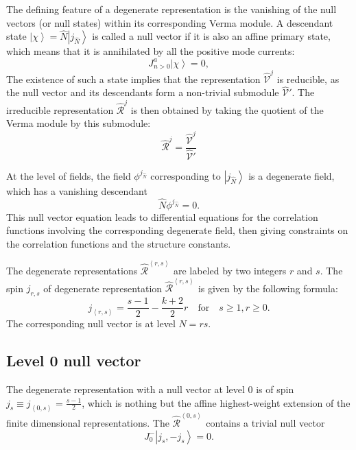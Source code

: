 \documentclass[10pt,a4paper]{article}
\numberwithin{equation}{section}
\newcommand{\ket}[1]{\left| #1 \right\rangle}
\newcommand{\vev}[1]{\left\langle #1 \right\rangle}
\begin{document}
The defining feature of a degenerate representation is the vanishing of the null vectors (or null states) within its corresponding Verma module.
A descendant state $\ket{\chi} = \hat{N} \ket{j_{\hat{N}}} $ is called a null vector if it is also an affine primary state, which means 
that it is annihilated by all the positive mode currents:
\begin{equation}
    J^{a}_{n>0} \ket{\chi} = 0, \label{nullvectoreq}
\end{equation}
The existence of such a state implies that the representation $\widehat{\mathcal{V}}^{j}$ is reducible, 
as the null vector and its descendants form a non-trivial submodule $\widehat{\mathcal{V}}'$. 
The irreducible representation $\widehat{\mathcal{R}}^{j}$ is then obtained by taking the quotient of the Verma module by this submodule:
\begin{equation}
    \widehat{\mathcal{R}}^{j} = \frac{\widehat{\mathcal{V}}^{j}}{ \widehat{\mathcal{V}}'}
\end{equation}

At the level of fields, the field $\phi^{j_{\hat{N}}}$ corresponding to
$\ket{j_{\hat{N}}}$ is a degenerate field, which has a vanishing descendant 
\begin{equation}
    \hat{N} \phi^{j_{\hat{N}}} = 0.
\end{equation}
This null vector equation leads to differential equations for the correlation functions involving the corresponding degenerate field, then 
giving constraints on the correlation functions and the structure constants. 

The degenerate representations $\widehat{\mathcal{R}}^{\vev{r,s}}$ are labeled by two integers $r$ and $s$. The spin $j_{r,s}$ of 
degenerate representation $\widehat{\mathcal{R}}^{\vev{r,s}}$ is given by the following formula: 
\begin{equation}
    j_{\vev{r,s}} = \frac{s-1}{2} - \frac{k+2}{2} r \quad \mathrm{for} \quad s\geq 1, r \geq 0.
\end{equation}
The corresponding null vector is at level $N=rs$.

\subsection{Level 0 null vector}
The degenerate representation with a null vector at level 0 is of spin $j_{s} \equiv j_{\vev{0,s}}  = \frac{s-1}{2}$, which is nothing but the affine 
highest-weight extension of the finite dimensional representations. The $\widehat{\mathcal{R}}^{\vev{0,s}}$ contains a trivial null 
vector 
\begin{equation}
    J^{-}_{0} \ket{j_{s},-j_{s}} = 0.
\end{equation}
\end{document}
